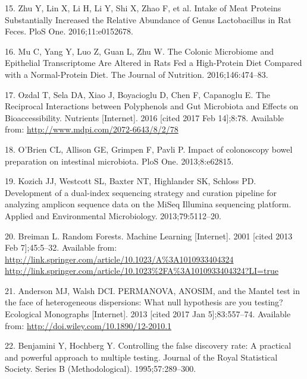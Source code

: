 \documentclass[12pt,]{article}
\begin{document}
\hypertarget{ref-zhu_intake_2016}{}
15. Zhu Y, Lin X, Li H, Li Y, Shi X, Zhao F, et al. Intake of Meat
Proteins Substantially Increased the Relative Abundance of Genus
Lactobacillus in Rat Feces. PloS One. 2016;11:e0152678.

\hypertarget{ref-mu_colonic_2016}{}
16. Mu C, Yang Y, Luo Z, Guan L, Zhu W. The Colonic Microbiome and
Epithelial Transcriptome Are Altered in Rats Fed a High-Protein Diet
Compared with a Normal-Protein Diet. The Journal of Nutrition.
2016;146:474--83.

\hypertarget{ref-ozdal_reciprocal_2016}{}
17. Ozdal T, Sela DA, Xiao J, Boyacioglu D, Chen F, Capanoglu E. The
Reciprocal Interactions between Polyphenols and Gut Microbiota and
Effects on Bioaccessibility. Nutrients {[}Internet{]}. 2016 {[}cited
2017 Feb 14{]};8:78. Available from:
\url{http://www.mdpi.com/2072-6643/8/2/78}

\hypertarget{ref-obrien_impact_2013}{}
18. O'Brien CL, Allison GE, Grimpen F, Pavli P. Impact of colonoscopy
bowel preparation on intestinal microbiota. PloS One. 2013;8:e62815.

\hypertarget{ref-kozich_development_2013}{}
19. Kozich JJ, Westcott SL, Baxter NT, Highlander SK, Schloss PD.
Development of a dual-index sequencing strategy and curation pipeline
for analyzing amplicon sequence data on the MiSeq Illumina sequencing
platform. Applied and Environmental Microbiology. 2013;79:5112--20.

\hypertarget{ref-breiman_random_2001}{}
20. Breiman L. Random Forests. Machine Learning {[}Internet{]}. 2001
{[}cited 2013 Feb 7{]};45:5--32. Available from:
\href{http://link.springer.com/article/10.1023/A\%3A1010933404324\%20http://link.springer.com/article/10.1023\%2FA\%3A1010933404324?LI=true}{http://link.springer.com/article/10.1023/A\%3A1010933404324 http://link.springer.com/article/10.1023\%2FA\%3A1010933404324?LI=true}

\hypertarget{ref-anderson_permanova_2013}{}
21. Anderson MJ, Walsh DCI. PERMANOVA, ANOSIM, and the Mantel test in
the face of heterogeneous dispersions: What null hypothesis are you
testing? Ecological Monographs {[}Internet{]}. 2013 {[}cited 2017 Jan
5{]};83:557--74. Available from:
\url{http://doi.wiley.com/10.1890/12-2010.1}

\hypertarget{ref-benjamini_controlling_1995}{}
22. Benjamini Y, Hochberg Y. Controlling the false discovery rate: A
practical and powerful approach to multiple testing. Journal of the
Royal Statistical Society. Series B (Methodological). 1995;57:289--300.
\end{document}
